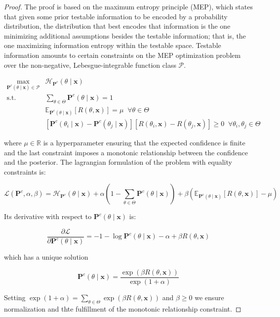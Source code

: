 \begin{proof}
    The proof is based on the maximum entropy principle (MEP), which states that
    given some prior testable information to be encoded by a probability 
    distribution, the distribution that best encodes that information is the one
    minimizing additional assumptions besides the testable information; that is, the one
    maximizing information entropy within the testable space. Testable information amounts to certain constraints on
    the MEP optimization problem over the non-negative, Lebesgue-integrable function class $\mathcal{P}$.

    $$
    \begin{aligned}
        \underset{\mathbf{P}^c(\theta \mid \bm{x}) \in \mathcal{P}}{\operatorname{max}} & \mathcal{H}_{\mathbf{P}^c}(\theta \mid \bm{x}) \\
        \text {s.t.} & \sum_{\theta \in \Theta} \mathbf{P}^c(\theta \mid \bm{x}) = 1 \\
        & \mathbb{E}_{\mathbf{P}^c(\theta \mid \bm{x})}[R(\theta, \bm{x})]=\mu \;\; \forall \theta \in \Theta \\
        & [\mathbf{P}^c(\theta_i \mid \bm{x}) - \mathbf{P}^c(\theta_j \mid \bm{x})][R(\theta_i, \bm{x}) - R(\theta_j, \bm{x})] \geq 0 \;\; \forall \theta_i, \theta_j \in \Theta
    \end{aligned}
    $$

    where $\mu \in \mathbb{R}$ is a hyperparameter ensuring that the expected confidence is finite
    and the last constraint imposes a monotonic relationship between the confidence and the posterior.
    The lagrangian formulation of the problem with equality constraints is:

    $$
        \mathcal{L}(\mathbf{P}^c, \alpha, \beta) = \mathcal{H}_{\mathbf{P}^c}(\theta \mid \bm{x}) + \alpha \left ( 1 - \sum_{\theta \in \Theta} \mathbf{P}^c(\theta \mid \bm{x}) \right ) +
        \beta  \left ( \mathbb{E}_{\mathbf{P}^c(\theta \mid \bm{x})}[R(\theta, \bm{x})] - \mu \right )
    $$

    Its derivative with respect to $\mathbf{P}^c(\theta \mid \bm{x})$ is:

    $$
    \frac{\partial \mathcal{L}}{\partial \mathbf{P}^c(\theta \mid \bm{x})} = -1 - \log \mathbf{P}^c(\theta \mid \bm{x}) - \alpha + \beta R(\theta, \bm{x})
    $$

    which has a unique solution

    $$
    \mathbf{P}^c(\theta \mid \bm{x}) = \frac{\exp \left ( \beta R(\theta, \bm{x}) \right )}{\exp \left ( 1+ \alpha \right )}
    $$

    Setting $\exp \left ( 1+ \alpha \right ) = \sum_{\theta \in \Theta} \exp \left ( \beta R(\theta, \bm{x}) \right )$ and $\beta \geq 0$ 
    we ensure normalization and thte fulfillment of the monotonic relationship constraint.
\end{proof}

